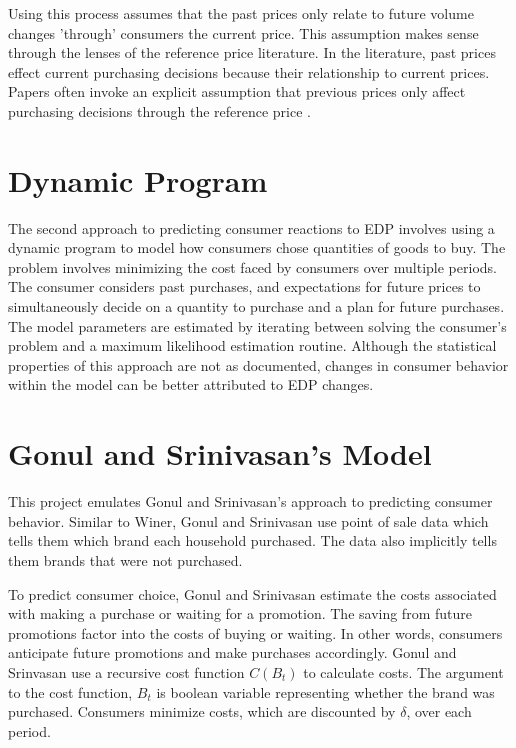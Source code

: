 \documentclass{article}
\begin{document}
Using this process assumes that the past prices only relate to future volume changes 'through' consumers the current price. This assumption makes sense through the lenses of the reference price literature. In the literature, past prices effect current purchasing decisions because their relationship to current prices. Papers often invoke an explicit assumption that previous prices only affect purchasing decisions through the reference price \cite{putler}.

\section{Dynamic Program}

The second approach to predicting consumer reactions to EDP involves using a dynamic program to model how consumers chose quantities of goods to buy. The problem involves minimizing the cost faced by consumers over multiple periods. The consumer considers past purchases, and expectations for future prices to simultaneously decide on a quantity to purchase and a plan for future purchases. The model parameters are estimated by iterating between solving the consumer's problem and a maximum likelihood estimation routine. Although the statistical properties of this approach are not as documented, changes in consumer behavior within the model can be better attributed to EDP changes.

\section{Gonul and Srinivasan's Model}

This project emulates Gonul and Srinivasan's approach to predicting consumer behavior\cite{gonul}. Similar to Winer, Gonul and Srinivasan use point of sale data which tells them which brand each household purchased. The data also implicitly tells them brands that were not purchased. 

To predict consumer choice, Gonul and Srinivasan estimate the costs associated with making a purchase or waiting for a promotion. The saving from future promotions factor into the costs of buying or waiting. In other words, consumers anticipate future promotions and make purchases accordingly. Gonul and Srinvasan use a recursive cost function $C(B_t)$ to calculate costs. The argument to the cost function, $B_t$ is boolean variable representing whether the brand was purchased. Consumers minimize costs, which are discounted by $\delta$, over each period.
\end{document}
